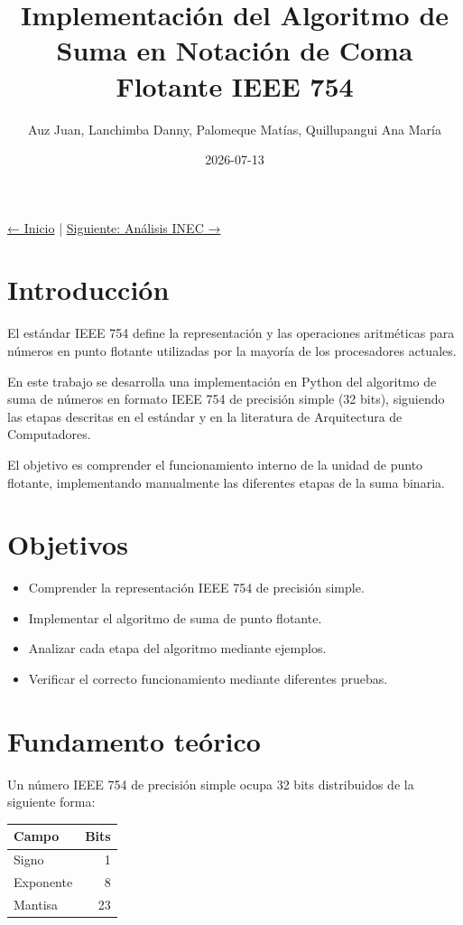 \documentclass[11pt]{article}
\author{Auz Juan, Lanchimba Danny, Palomeque Matías, Quillupangui Ana María}
\date{2026-07-13}
\title{Implementación del Algoritmo de Suma en Notación de Coma Flotante IEEE 754}
\begin{document}
\maketitle
\tableofcontents

\href{../index.org}{← Inicio} | \href{../page3-inec.org}{Siguiente: Análisis INEC →}
\section{Introducción}
\label{sec:orgab50853}

El estándar IEEE 754 define la representación y las operaciones
aritméticas para números en punto flotante utilizadas por la mayoría de
los procesadores actuales.

En este trabajo se desarrolla una implementación en Python del algoritmo
de suma de números en formato IEEE 754 de precisión simple (32 bits),
siguiendo las etapas descritas en el estándar y en la literatura de
Arquitectura de Computadores.

El objetivo es comprender el funcionamiento interno de la unidad de
punto flotante, implementando manualmente las diferentes etapas de
la suma binaria.
\section{Objetivos}
\label{sec:org1df9565}

\begin{itemize}
\item Comprender la representación IEEE 754 de precisión simple.
\item Implementar el algoritmo de suma de punto flotante.
\item Analizar cada etapa del algoritmo mediante ejemplos.
\item Verificar el correcto funcionamiento mediante diferentes pruebas.
\end{itemize}
\section{Fundamento teórico}
\label{sec:orgac7ae41}

Un número IEEE 754 de precisión simple ocupa 32 bits distribuidos de la
siguiente forma:

\begin{center}
\begin{tabular}{lr}
Campo & Bits\\
\hline
Signo & 1\\
Exponente & 8\\
Mantisa & 23\\
\end{tabular}
\end{center}
\end{document}
